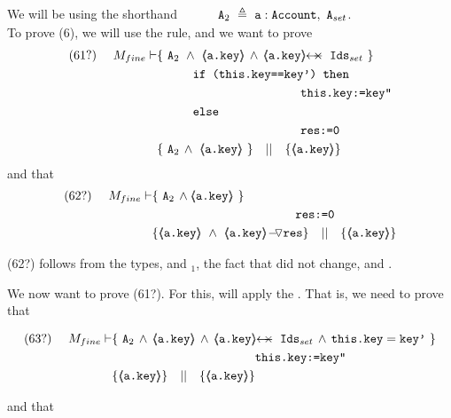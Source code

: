 \begin{proofO}
We will be  using the shorthand 
 $~ \strut \hspace{.9cm}  \mbox{\normalfont{\texttt{A}}}_{2}\ \triangleq \  \mbox{\normalfont{\texttt{a}}}:\mbox{\normalfont{\texttt{Account}}},\  \mbox{\normalfont{\texttt{A}}}_{set}$.\\


To prove (6), we will use the  {} rule, and we want to prove
\\
\begin{align*}
\text{(61?)}  \ \ \ \ M_{fine} \vdash 
		&	\{  \ \Alocalssets\ \wedge\  {\inside{\prg{a.key}}} \, \wedge \, \protectedFrom {\prg{a.key}} {\Idsset} \  \} \\
		& \SPT   \prg{if (this.key==key') then }\\
		& \SPT \SPT   \SPT\SPT  \prg{this.key:=key''} \\
	        & \SPT   \prg{else }\\
		& \SPT\SPT   \SPT\SPT  \prg{res:=0} \\
		& \{ \ \Alocalssets\,\wedge\ {\inside{\prg{a.key}}}\    \} \ \ \  || \ \ \ 
		   \{ {\inside{\prg{a.key}}} \}
\end{align*}
and that
\begin{align*}
\text{(62?)}  \ \ \ \ M_{fine} \vdash
          &  \{ \ \Alocalssets\,\wedge \inside{\prg{a.key}} \  \}  \\
		& \SPT\SPT   \SPT\SPT  \prg{res:=0} \\
		& \{ {\inside{\prg{a.key}}}\ \wedge\ {\PushASLong {\prg{res}} {\inside{\prg{a.key}}}}  \} \ \ \  || \ \ \ 
		   \{ {\inside{\prg{a.key}}} \}
\end{align*}

(62?) follows   from the types, and {}$_1$, the fact that  did not change, and  .

\vspace{.5cm}
We now  want to  prove (61?). For this, will apply the {}. That is, we need to prove that

\begin{align*}
\text{(63?)}  \ \ \ \ M_{fine} \vdash 
		&	\{  \ \Alocalssets\,\wedge\, {\inside{\prg{a.key}}} \, \wedge \, \protectedFrom {\prg{a.key}} {\Idsset} \, \wedge  \,  \prg{this.key}=\prg{key'}\  \} \\
		& \SPT \SPT   \SPT\SPT  \prg{this.key:=key''} \\
		& \{ {\inside{\prg{a.key}}}  \} \ \ \  || \ \ \ 
		   \{ {\inside{\prg{a.key}}} \}
\end{align*}
 
and that
 

\end{proofO}
